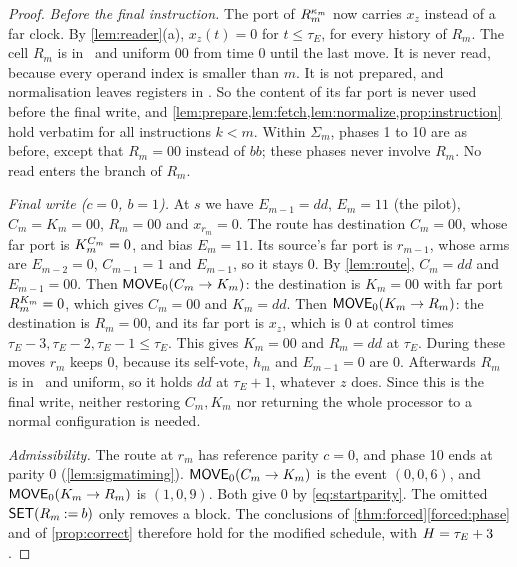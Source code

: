 \begin{proof}
\emph{Before the final instruction.} The port of $R_m^{\kappa_m}$ now carries $x_z$ instead of a
far clock. By \cref{lem:reader}(a), $x_z(t)=0$ for $t\le\tau_E$, for every history of $R_m$. The cell
$R_m$ is in \HOLD\ and uniform $00$ from time $0$ until the last move. It is never read, because every
operand index is smaller than $m$. It is not prepared, and normalisation leaves registers in \HOLD.
So the content of its far port is never used before the final write, and
\cref{lem:prepare,lem:fetch,lem:normalize,prop:instruction} hold verbatim for all instructions
$k<m$. Within $\Sigma_m$, phases 1 to 10 are as before, except that $R_m=00$ instead of $bb$; these
phases never involve $R_m$. No read enters the branch of $R_m$.

\emph{Final write ($c=0$, $b=1$).} At $s$ we have $E_{m-1}=dd$, $E_m=11$ (the pilot), $C_m=K_m=00$,
$R_m=00$ and $x_{r_m}=0$. The route has destination $C_m=00$, whose far port is $K_m^{C_m}=0$, and
bias $E_m=11$. Its source's far port is $r_{m-1}$, whose arms are $E_{m-2}=0$, $C_{m-1}=1$ and
$E_{m-1}$, so it stays $0$. By \cref{lem:route}, $C_m=dd$ and $E_{m-1}=00$. Then
$\textsf{MOVE}_0(C_m\to K_m)$: the destination is $K_m=00$ with far port $R_m^{K_m}=0$, which gives
$C_m=00$ and $K_m=dd$. Then $\textsf{MOVE}_0(K_m\to R_m)$: the destination is $R_m=00$, and its far
port is $x_z$, which is $0$ at control times $\tau_E-3,\tau_E-2,\tau_E-1\le\tau_E$. This gives
$K_m=00$ and $R_m=dd$ at $\tau_E$. During these moves $r_m$ keeps $0$, because its self-vote, $h_m$
and $E_{m-1}=0$ are $0$. Afterwards $R_m$ is in \HOLD\ and uniform, so it holds $dd$ at $\tau_E+1$,
whatever $z$ does. Since this is the final write, neither restoring $C_m,K_m$ nor returning the whole
processor to a normal configuration is needed.

\emph{Admissibility.} The route at $r_m$ has reference parity $c=0$, and phase 10 ends at parity $0$
(\cref{lem:sigmatiming}). $\textsf{MOVE}_0(C_m\to K_m)$ is the event $(0,0,6)$, and
$\textsf{MOVE}_0(K_m\to R_m)$ is $(1,0,9)$. Both give $0$ by \eqref{eq:startparity}. The omitted
$\textsf{SET}(R_m\mathbin{:=}b)$ only removes a block. The conclusions of \cref{thm:forced}\ref{forced:phase}
and of \cref{prop:correct} therefore hold for the modified schedule, with $H=\tau_E+3$.
\end{proof}

